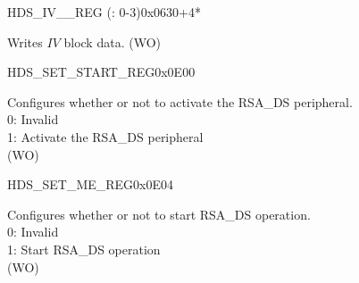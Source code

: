 


\begin{register}{H}{DS\_IV\_\_REG (: 0-3)}{0x0630+4*}
\label{regdesc:DSIVREG}
%
\regnewline%
\begin{regdesc}\begin{reglist}
\item [DS\_IV\_\regindex{m}\_REG] Writes \begin{math}IV\end{math} block data. (WO)
\end{reglist}\end{regdesc}
\end{register}


\begin{register}{H}{DS\_SET\_START\_REG}{0x0E00}\label{regdesc:DSSETSTARTREG}
%
%
\regnewline%
\begin{regdesc}\begin{reglist}
\item [DS\_SET\_START] Configures whether or not to activate the RSA\_DS peripheral.\\
0: Invalid\\
1: Activate the RSA\_DS peripheral\\
(WO)
\end{reglist}\end{regdesc}
\end{register}


\begin{register}{H}{DS\_SET\_ME\_REG}{0x0E04}\label{regdesc:DSSETMEREG}
%
%
\regnewline%
\begin{regdesc}\begin{reglist}
\item [DS\_SET\_ME] Configures whether or not to start RSA\_DS operation. \\
0: Invalid\\
1: Start RSA\_DS operation\\
(WO)
\end{reglist}\end{regdesc}
\end{register}


